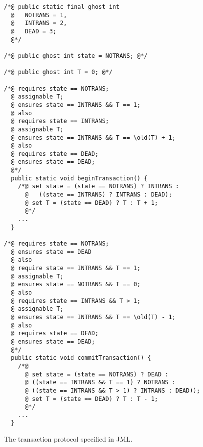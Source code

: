 \documentclass[a4paper,10pt]{article}
\begin{document}
\begin{figure}
\begin{verbatim}
/*@ public static final ghost int
  @   NOTRANS = 1,
  @   INTRANS = 2,
  @   DEAD = 3; 
  @*/

/*@ public ghost int state = NOTRANS; @*/

/*@ public ghost int T = 0; @*/

/*@ requires state == NOTRANS;
  @ assignable T;
  @ ensures state == INTRANS && T == 1;
  @ also
  @ requires state == INTRANS;
  @ assignable T;
  @ ensures state == INTRANS && T == \old(T) + 1;
  @ also
  @ requires state == DEAD;
  @ ensures state == DEAD; 
  @*/
  public static void beginTransaction() {
    /*@ set state = (state == NOTRANS) ? INTRANS : 
      @   ((state == INTRANS) ? INTRANS : DEAD);
      @ set T = (state == DEAD) ? T : T + 1;
      @*/ 
    ... 
  }
  
/*@ requires state == NOTRANS;
  @ ensures state == DEAD
  @ also
  @ require state == INTRANS && T == 1;
  @ assignable T;
  @ ensures state == NOTRANS && T == 0;
  @ also
  @ requires state == INTRANS && T > 1;
  @ assignable T;
  @ ensures state == INTRANS && T == \old(T) - 1;
  @ also
  @ requires state == DEAD;
  @ ensures state == DEAD; 
  @*/
  public static void commitTransaction() {
    /*@
      @ set state = (state == NOTRANS) ? DEAD : 
      @ ((state == INTRANS && T == 1) ? NOTRANS : 
      @ ((state == INTRANS && T > 1) ? INTRANS : DEAD));
      @ set T = (state == DEAD) ? T : T - 1;
      @*/
    ... 
  }
\end{verbatim}
\caption{The transaction protocol specified in JML.}\label{fig:JMLTrans}
\end{figure}
\end{document}
